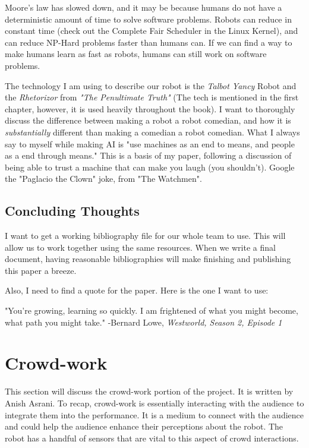 \documentclass[onecolumn, draftclsnofoot,10pt, compsoc]{IEEEtran}
\begin{document}
	Moore's law has slowed down, and it may be because humans do not have a deterministic amount of time to solve software problems. Robots can reduce in constant time (check out the Complete Fair Scheduler in the Linux Kernel), and can reduce NP-Hard problems faster than humans can. If we can find a way to make humans learn as fast as robots, humans can still work on software problems.

	The technology I am using to describe our robot is the \textit{Talbot Yancy} Robot and the \textit{Rhetorizor} from \textit{"The Penultimate Truth"} (The tech is mentioned in the first chapter, however, it is used heavily throughout the book). I want to thoroughly discuss the difference between making a robot a robot comedian, and how it is \textit{substantially} different than making a comedian a robot comedian. What I always say to myself while making AI is "use machines as an end to means, and people as a end through means." This is a basis of my paper, following a discussion of being able to trust a machine that can make you laugh (you shouldn't). Google the "Paglacio the Clown" joke, from "The Watchmen".

\subsection{Concluding Thoughts}
 I want to get a working bibliography file for our whole team to use. This will allow us to work together using the same resources. When we write a final document, having reasonable bibliographies will make finishing and publishing this paper a breeze.


 Also, I need to find a quote for the paper. Here is the one I want to use:


 \begin{displayquote}
	 "You're growing, learning so quickly. I am frightened of what you might become, what path you might take."
	 -Bernard Lowe, \textit{Westworld, Season 2, Episode 1}
 \end{displayquote}



\section{Crowd-work}
This section will discuss the crowd-work portion of the project. It is written by Anish Asrani. To recap, crowd-work is essentially interacting with the audience to integrate them into the performance. It is a medium to connect with the audience and could help the audience enhance their perceptions about the robot. The robot has a handful of sensors that are vital to this aspect of crowd interactions.
\end{document}

